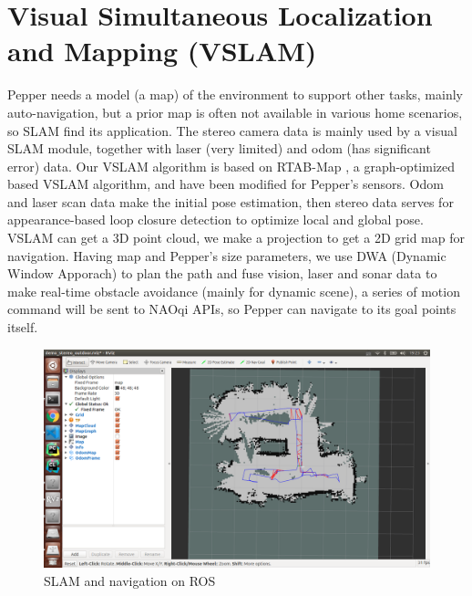 \section{Visual Simultaneous Localization and Mapping (VSLAM)}
\label{sec:vslam}

Pepper needs a model (a map) of the environment to support other tasks, mainly auto-navigation, but a prior map is often not available in various home scenarios, so SLAM find its application. 
The stereo camera data is mainly used by a visual SLAM module, together with laser (very limited) and odom (has significant error) data. 
Our VSLAM algorithm is based on RTAB-Map \cite{closuredetection,rtabmap}, a graph-optimized based VSLAM algorithm, and have been modified for Pepper's sensors. 
Odom and laser scan data make the initial pose estimation, then stereo data serves for appearance-based loop closure detection to optimize local and global pose. 
VSLAM can get a 3D point cloud, we make a projection to get a 2D grid map for navigation. 
Having map and Pepper’s size parameters, we use DWA (Dynamic Window Apporach) to plan the path and fuse vision, laser and sonar data to make real-time obstacle avoidance (mainly for dynamic scene), a series of motion command will be sent to NAOqi APIs, so Pepper can navigate to its goal points itself.

\begin{figure}[h]
    \centering
    \includegraphics[width=1.\textwidth]{figs/vslam_shortcut.png}
    \caption{SLAM and navigation on ROS}
    \label{fig:vslam}
\end{figure}